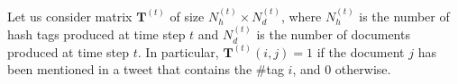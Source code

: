 % 




Let us consider matrix $\mathbf{T}^{(t)}$ of size $N_h^{(t)} \times N_d^{(t)}$, 
where  $N_h^{(t)}$ is the number of hash tags produced at time step $t$ and 
$N_d^{(t)}$ is the number of documents produced at time step $t$.
In particular, $\mathbf{T}^{(t)}(i,j) = 1$ if the document $j$ has been mentioned in a tweet 
that contains the \#tag $i$, and $0$ otherwise.



